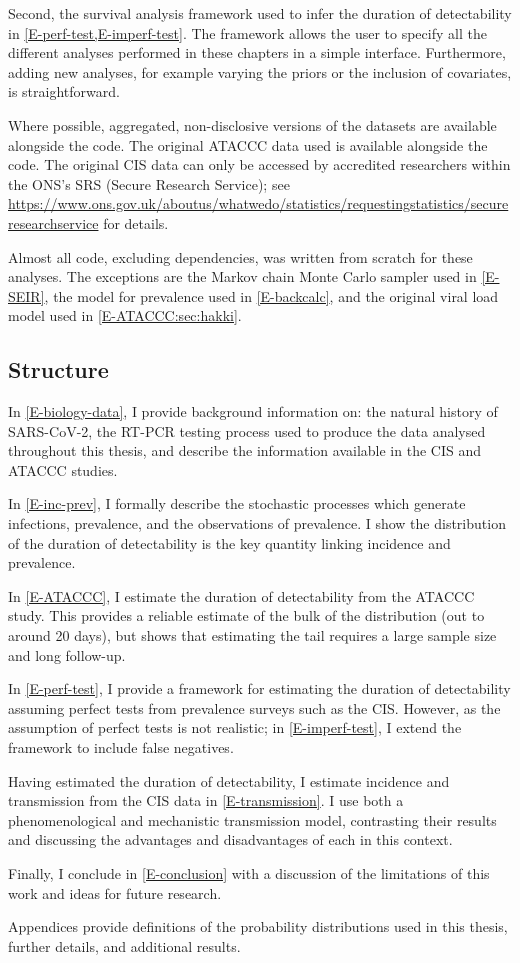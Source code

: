 \documentclass[thesis.tex]{subfiles}
\begin{document}
Second, the survival analysis framework used to infer the duration of detectability in \cref{E-perf-test,E-imperf-test}.
The framework allows the user to specify all the different analyses performed in these chapters in a simple interface. 
Furthermore, adding new analyses, for example varying the priors or the inclusion of covariates, is straightforward.

Where possible, aggregated, non-disclosive versions of the datasets are available alongside the code.
The original ATACCC data used is available alongside the code.
The original CIS data can only be accessed by accredited researchers within the ONS's SRS (Secure Research Service); see \url{https://www.ons.gov.uk/aboutus/whatwedo/statistics/requestingstatistics/secureresearchservice} for details.

Almost all code, excluding dependencies, was written from scratch for these analyses.
The exceptions are the Markov chain Monte Carlo sampler used in \cref{E-SEIR}, the model for prevalence used in \cref{E-backcalc}, and the original viral load model used in \cref{E-ATACCC:sec:hakki}.

\subsection{Structure}

In \cref{E-biology-data}, I provide background information on: the natural history of SARS-CoV-2, the RT-PCR testing process used to produce the data analysed throughout this thesis, and describe the information available in the CIS and ATACCC studies.

In \cref{E-inc-prev}, I formally describe the stochastic processes which generate infections, prevalence, and the observations of prevalence.
I show the distribution of the duration of detectability is the key quantity linking incidence and prevalence.

In \cref{E-ATACCC}, I estimate the duration of detectability from the ATACCC study.
This provides a reliable estimate of the bulk of the distribution (out to around 20 days),  but shows that estimating the tail requires a large sample size and long follow-up. 

In \cref{E-perf-test}, I provide a framework for estimating the duration of detectability assuming perfect tests from prevalence surveys such as the CIS.
However, as the assumption of perfect tests is not realistic; in \cref{E-imperf-test}, I extend the framework to include false negatives.

Having estimated the duration of detectability, I estimate incidence and transmission from the CIS data in \cref{E-transmission}.
I use both a phenomenological and mechanistic transmission model, contrasting their results and discussing the advantages and disadvantages of each in this context.

Finally, I conclude in \cref{E-conclusion} with a discussion of the limitations of this work and ideas for future research.

Appendices provide definitions of the probability distributions used in this thesis, further details, and additional results.


\ifSubfilesClassLoaded{
  \appendix
%   
  \listoftodos
}{}
\end{document}
